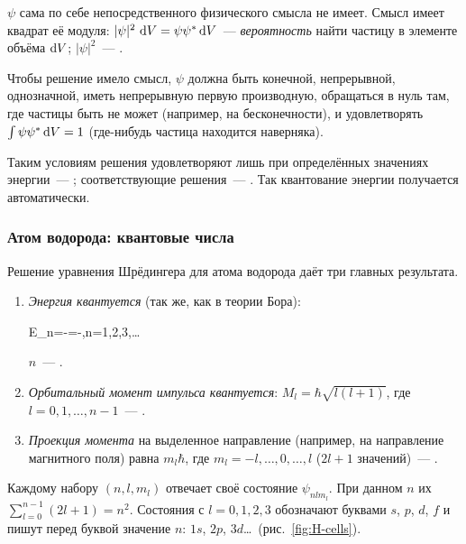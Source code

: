 \begin{opredelenie}
 $\psi$ сама по себе непосредственного физического
смысла не имеет. Смысл имеет квадрат её модуля: $|\psi|^2\,\mathop{}\!\mathrm{d} V=\psi\psi^*\mathop{}\!\mathrm{d} V$~—
\emph{вероятность} найти частицу в элементе объёма $\mathop{}\!\mathrm{d} V$; $|\psi|^2$~—
.
\end{opredelenie}

Чтобы решение имело смысл, $\psi$ должна быть конечной, непрерывной,
однозначной, иметь непрерывную первую производную, обращаться в нуль
там, где частицы быть не может (например, на бесконечности), и
удовлетворять  $\int\psi\psi^*\mathop{}\!\mathrm{d} V=1$
(где-нибудь частица находится наверняка).

Таким условиям решения удовлетворяют лишь при определённых значениях
энергии~— ; соответствующие решения~—
. Так квантование энергии получается
автоматически.

\subsubsection{Атом водорода: квантовые числа}

Решение уравнения Шрёдингера для атома водорода даёт три главных
результата.

\begin{enumerate}[label=\arabic*)]
\item \emph{Энергия квантуется} (так же, как в теории Бора):
\begin{keyeq}\label{eq:H-levels}
E_n=-\cdot{}=-,\qquad n=1,2,3,\ldots
\end{keyeq}
$n$~— .
\item \emph{Орбитальный момент импульса квантуется}:
$M_l=\hbar\sqrt{l(l+1)}$, где $l=0,1,\ldots,n-1$~— .
\item \emph{Проекция момента} на выделенное направление (например, на
направление магнитного поля) равна $m_l\hbar$, где
$m_l=-l,\ldots,0,\ldots,l$ ($2l+1$ значений)~— .
\end{enumerate}
Каждому набору $(n,l,m_l)$ отвечает своё состояние $\psi_{nlm_l}$. При
данном $n$ их $\sum_{l=0}^{n-1}(2l+1)=n^2$. Состояния с $l=0,1,2,3$
обозначают буквами $s$, $p$, $d$, $f$ и пишут перед буквой значение $n$:
$1s$, $2p$, $3d$\ldots\ (рис.~\ref{fig:H-cells}).

